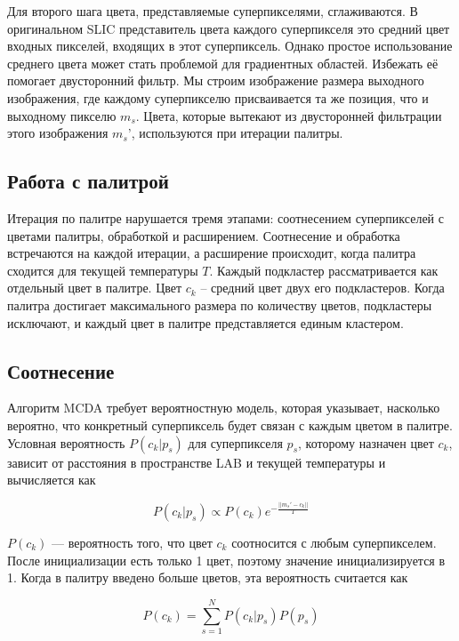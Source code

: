 \documentclass[a4paper,12pt]{report}
\theoremstyle{remark}
\begin{document}
Для второго шага цвета, представляемые суперпикселями, сглаживаются. В оригинальном SLIC представитель цвета каждого суперпикселя это средний цвет входных пикселей, входящих в этот суперпиксель. Однако простое использование среднего цвета может стать проблемой для градиентных областей. Избежать её помогает двусторонний фильтр. Мы строим изображение размера выходного изображения, где каждому суперпикселю присваивается та же позиция, что и выходному пикселю $m_s$. Цвета, которые вытекают из двусторонней фильтрации этого изображения $m_s’$, используются при итерации палитры.

\subsection{Работа с палитрой}

Итерация по палитре нарушается тремя этапами: соотнесением суперпикселей с цветами палитры, обработкой и расширением. Соотнесение и обработка встречаются на каждой итерации, а расширение происходит, когда палитра сходится для текущей температуры $T.$ Каждый подкластер рассматривается как отдельный цвет в палитре. Цвет $c_k$ – средний цвет двух его подкластеров. Когда палитра достигает максимального размера по количеству цветов, подкластеры исключают, и каждый цвет в палитре представляется единым кластером.

\subsection{Соотнесение}

Алгоритм MCDA требует вероятностную модель, которая указывает, насколько вероятно, что конкретный суперпиксель будет связан с каждым цветом в палитре. Условная вероятность $P(c_k|p_s)$ для суперпикселя $p_s$, которому назначен цвет $c_k$, зависит от расстояния в пространстве LAB и текущей температуры и вычисляется как

\begin{equation}
P(c_k|p_s) \propto P(c_k) e^{-\frac{||m_s' - c_k||}{T}}
\label{prob}
\end{equation}

$P(c_k)$ — вероятность того, что цвет $c_k$ соотносится с любым суперпикселем. После инициализации есть только 1 цвет, поэтому значение инициализируется в 1. Когда в палитру введено больше цветов, эта вероятность считается как 

\begin{equation}
P(c_k) = \sum_{s=1}^{N}P(c_k|p_s)P(p_s)
\end{equation}
\end{document}

